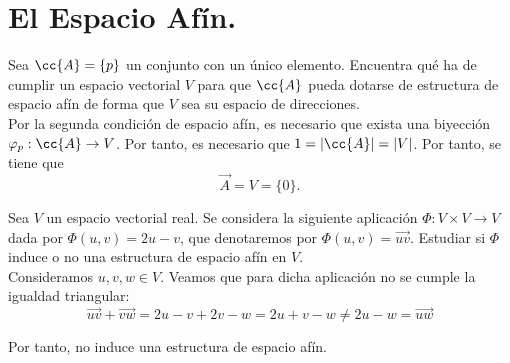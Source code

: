 \section{El Espacio Afín.}\label{Rel:Tema1}


\begin{ejercicio}
    Sea $\cc{A} = \{p\}$ un conjunto con un único elemento. Encuentra qué ha de cumplir un espacio vectorial $V$ para que $\cc{A}$ pueda dotarse de estructura de espacio afín de forma que $V$ sea su espacio de direcciones.\\

    Por la segunda condición de espacio afín, es necesario que exista una biyección $\varphi_p:\cc{A}\to V$. Por tanto, es necesario que $1=|\cc{A}|=|V|$. Por tanto, se tiene que 
    $$\vec{A}=V=\{0\}.$$
\end{ejercicio}

\begin{ejercicio}
     Sea $V$ un espacio vectorial real. Se considera la siguiente aplicación $\Phi:V\times V \to V$ dada por $\Phi(u, v) = 2u - v$, que denotaremos por $\Phi(u, v) = \vec{uv}$. Estudiar si $\Phi$ induce o no una estructura de espacio afín en $V$.\\

     Consideramos $u,v,w\in V$. Veamos que para dicha aplicación no se cumple la igualdad triangular:
     \begin{equation*}
         \vec{uv} + \vec{vw} = 2u-v+2v-w = 2u+v-w\neq 2u-w=\vec{uw}
     \end{equation*}

     Por tanto, no induce una estructura de espacio afín.
\end{ejercicio}


